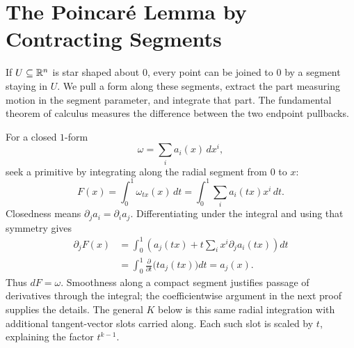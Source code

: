 \section{The Poincar\'e Lemma by Contracting Segments}
\label{sec:poincare-lemma}
If $U\subseteq\mathbb{R}^n$ is star shaped about $0$, every point can be joined
to $0$ by a segment staying in $U$. We pull a form along these segments,
extract the part measuring motion in the segment parameter, and integrate
that part. The fundamental theorem of calculus measures the difference
between the two endpoint pullbacks.

\begin{example}
For a closed $1$-form
\[
\omega=\sum_i a_i(x)\,dx^i,
\]
 seek a primitive by
integrating along the radial segment from $0$ to $x$:
\[
F(x)=\int_0^1\omega_{tx}(x)\,dt
=\int_0^1\sum_i a_i(tx)x^i\,dt.
\]
Closedness means $\partial_j a_i=\partial_i a_j$. Differentiating under
the integral and using that symmetry gives
\[
\begin{aligned}
\partial_jF(x)
&=\int_0^1\left(a_j(tx)+t\sum_i x^i\partial_j a_i(tx)\right)dt\\
&=\int_0^1\frac{\partial}{\partial t}\bigl(t a_j(tx)\bigr)dt
=a_j(x).
\end{aligned}
\]
Thus $dF=\omega$. Smoothness along a compact segment justifies passage of
derivatives through the integral; the coefficientwise argument in the next
proof supplies the details. The general $K$ below is this same radial
integration with additional tangent-vector slots carried along. Each such
slot is scaled by $t$, explaining the factor $t^{k-1}$.
\end{example}

